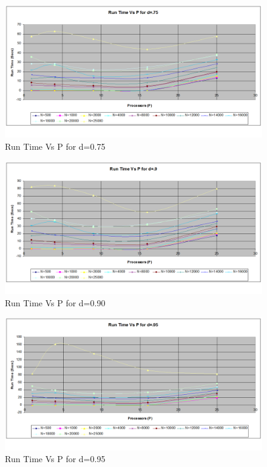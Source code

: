 \documentclass[twoside,11pt]{article}\usepackage{amsmath,amsfonts,amsthm,fullpage}
\begin{document}
\begin{figure}[!htbp]
\centering
\includegraphics[scale=.46]{charts/runtime_p_n_d_75} 
\caption{Run Time Vs P for d=0.75}
\label{Run Time Vs P for d=0.75}
\end{figure}

\begin{figure}[!htbp]
\centering
\includegraphics[scale=.46]{charts/runtime_p_n_d_90} 
\caption{Run Time Vs P for d=0.90}
\label{Run Time Vs P for d=0.90}
\end{figure}

\begin{figure}[!htbp]
\centering
\includegraphics[scale=.46]{charts/runtime_p_n_d_95} 
\caption{Run Time Vs P for d=0.95}
\label{Run Time Vs P for d=0.95}
\end{figure}
\end{document}
